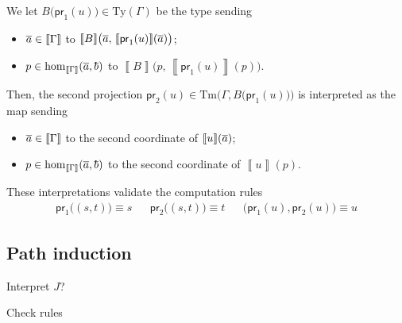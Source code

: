 \documentclass{article}
\theoremstyle{definition}
\renewcommand{\int}[1]{\mathopen{}\left\llbracket #1
    \right\rrbracket\mathclose{}}       %
\newcommand{\tproj}{\mathsf{pr}}
\newcommand{\Ty}{\mathrm{Ty}}
\newcommand{\Tm}{\mathrm{Tm}}
\renewcommand{\hom}[3][]{\mathrm{hom}_{#1}\mathopen{}\left( #2, #3 \right)\mathclose{}}
\newcommand{\tup}[1]{\overline{\smash{#1}\vphantom{a}}}
\begin{document}
We let $B \big( \tproj_1(u) \big) \in \Ty(\Gamma)$ be the type sending
\begin{itemize}
    \item $\tup{a} \in \int{\Gamma}$ to $\int{B} \big( \tup{a},\, \int{\tproj_1(u)}(\tup{a}) \big)$;
    
    \item $p \in \hom[\int{\Gamma}]{\tup{a}}{\tup{b}}$ to $\int{B} \big( p,\, \int{\tproj_1(u)}(p) \big)$.
\end{itemize}
Then, the second projection $\tproj_2(u) \in \Tm \Big( \Gamma, B \big( \tproj_1(u) \big) \Big)$ is interpreted as the map sending
\begin{itemize}
    \item $\tup{a} \in \int{\Gamma}$ to the second coordinate of $\int{u}(\tup{a})$;
    
    \item $p \in \hom[\int{\Gamma}]{\tup{a}}{\tup{b}}$ to the second coordinate of $\int{u}(p)$.
\end{itemize}

These interpretations validate the computation rules
\begin{align*}
    \tproj_1 \big( (s,t) \big) \equiv s & & \tproj_2 \big( (s,t) \big) \equiv t & & \big( \tproj_1(u), \tproj_2(u) \big) \equiv u
\end{align*}


\subsection{Path induction}
\label{sec:gpd-eq-ind}

{\color{red} 
Interpret $J$?

Check rules}
\end{document}
